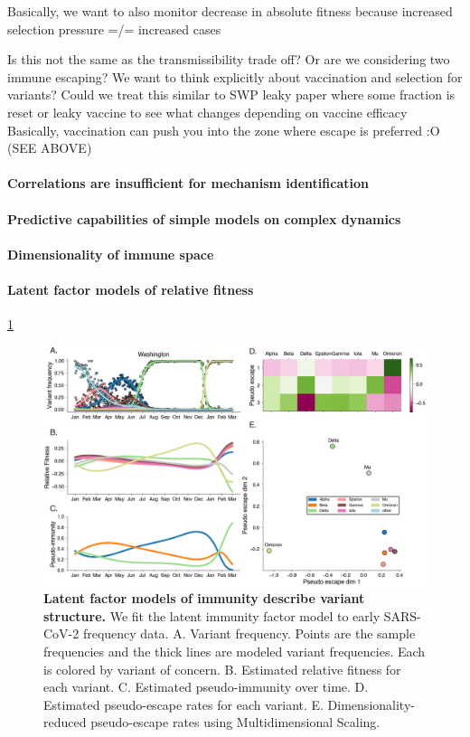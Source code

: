 \documentclass[12pt,oneside,letterpaper]{article}
\begin{document}
Basically, we want to also monitor decrease in absolute fitness because increased selection pressure =/= increased cases


Is this not the same as the transmissibility trade off? Or are we considering two immune escaping?
We want to think explicitly about vaccination and selection for variants?
Could we treat this similar to SWP leaky paper where some fraction is reset or leaky vaccine to see what changes depending on vaccine efficacy
Basically, vaccination can push you into the zone where escape is preferred :O (SEE ABOVE)

\paragraph{Correlations are insufficient for mechanism identification}%

\paragraph{Predictive capabilities of simple models on complex dynamics}%

\paragraph{Dimensionality of immune space}%

\paragraph{Latent factor models of relative fitness}

\ref{fig:latent_immune}

\begin{figure}[h]
    \centering
    \includegraphics[width=0.8\linewidth]{./figures/latent_immune.png}
    \caption{\textbf{Latent factor models of immunity describe variant structure.} 
        We fit the latent immunity factor model to early SARS-CoV-2 frequency data.
        A. Variant frequency. Points are the sample frequencies and the thick lines are modeled variant frequencies. Each is colored by variant of concern.
        B. Estimated relative fitness for each variant.
        C. Estimated pseudo-immunity over time.
        D. Estimated pseudo-escape rates for each variant.
        E. Dimensionality-reduced pseudo-escape rates using Multidimensional Scaling.
    }
    \label{fig:latent_immune}
\end{figure}
\end{document}
